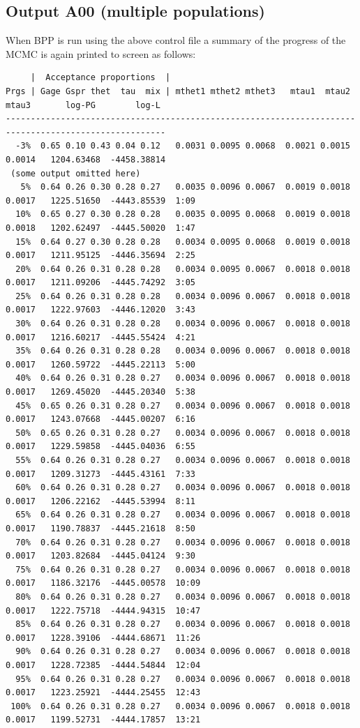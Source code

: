 \documentclass[a4paper]{book}
\numberwithin{equation}{section} \renewcommand{\baselinestretch}{0.55}
\begin{document}
\subsection{Output A00 (multiple populations)}
When BPP is run using the above control file a summary of the progress of the
MCMC is again printed to screen as follows:
{\tiny
\begin{verbatim}
     |  Acceptance proportions  |
Prgs | Gage Gspr thet  tau  mix | mthet1 mthet2 mthet3   mtau1  mtau2  mtau3       log-PG        log-L
------------------------------------------------------------------------------------------------------
  -3%  0.65 0.10 0.43 0.04 0.12   0.0031 0.0095 0.0068  0.0021 0.0015 0.0014   1204.63468  -4458.38814
 (some output omitted here)
   5%  0.64 0.26 0.30 0.28 0.27   0.0035 0.0096 0.0067  0.0019 0.0018 0.0017   1225.51650  -4443.85539  1:09
  10%  0.65 0.27 0.30 0.28 0.28   0.0035 0.0095 0.0068  0.0019 0.0018 0.0018   1202.62497  -4445.50020  1:47
  15%  0.64 0.27 0.30 0.28 0.28   0.0034 0.0095 0.0068  0.0019 0.0018 0.0017   1211.95125  -4446.35694  2:25
  20%  0.64 0.26 0.31 0.28 0.28   0.0034 0.0095 0.0067  0.0018 0.0018 0.0017   1211.09206  -4445.74292  3:05
  25%  0.64 0.26 0.31 0.28 0.28   0.0034 0.0096 0.0067  0.0018 0.0018 0.0017   1222.97603  -4446.12020  3:43
  30%  0.64 0.26 0.31 0.28 0.28   0.0034 0.0096 0.0067  0.0018 0.0018 0.0017   1216.60217  -4445.55424  4:21
  35%  0.64 0.26 0.31 0.28 0.28   0.0034 0.0096 0.0067  0.0018 0.0018 0.0017   1260.59722  -4445.22113  5:00
  40%  0.64 0.26 0.31 0.28 0.27   0.0034 0.0096 0.0067  0.0018 0.0018 0.0017   1269.45020  -4445.20340  5:38
  45%  0.65 0.26 0.31 0.28 0.27   0.0034 0.0096 0.0067  0.0018 0.0018 0.0017   1243.07668  -4445.00207  6:16
  50%  0.65 0.26 0.31 0.28 0.27   0.0034 0.0096 0.0067  0.0018 0.0018 0.0017   1229.59858  -4445.04036  6:55
  55%  0.64 0.26 0.31 0.28 0.27   0.0034 0.0096 0.0067  0.0018 0.0018 0.0017   1209.31273  -4445.43161  7:33
  60%  0.64 0.26 0.31 0.28 0.27   0.0034 0.0096 0.0067  0.0018 0.0018 0.0017   1206.22162  -4445.53994  8:11
  65%  0.64 0.26 0.31 0.28 0.27   0.0034 0.0096 0.0067  0.0018 0.0018 0.0017   1190.78837  -4445.21618  8:50
  70%  0.64 0.26 0.31 0.28 0.27   0.0034 0.0096 0.0067  0.0018 0.0018 0.0017   1203.82684  -4445.04124  9:30
  75%  0.64 0.26 0.31 0.28 0.27   0.0034 0.0096 0.0067  0.0018 0.0018 0.0017   1186.32176  -4445.00578  10:09
  80%  0.64 0.26 0.31 0.28 0.27   0.0034 0.0096 0.0067  0.0018 0.0018 0.0017   1222.75718  -4444.94315  10:47
  85%  0.64 0.26 0.31 0.28 0.27   0.0034 0.0096 0.0067  0.0018 0.0018 0.0017   1228.39106  -4444.68671  11:26
  90%  0.64 0.26 0.31 0.28 0.27   0.0034 0.0096 0.0067  0.0018 0.0018 0.0017   1228.72385  -4444.54844  12:04
  95%  0.64 0.26 0.31 0.28 0.27   0.0034 0.0096 0.0067  0.0018 0.0018 0.0017   1223.25921  -4444.25455  12:43
 100%  0.64 0.26 0.31 0.28 0.27   0.0034 0.0096 0.0067  0.0018 0.0018 0.0017   1199.52731  -4444.17857  13:21


\end{verbatim}}
\end{document}

